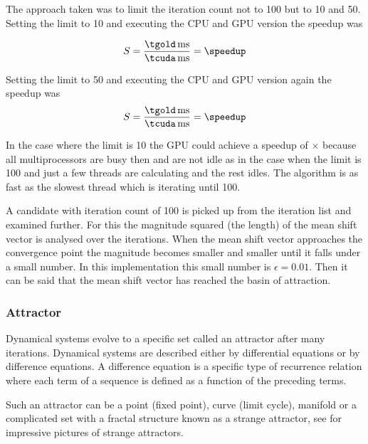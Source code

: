 The approach taken was to limit the iteration count not to 100 but to 10 and 50.
Setting the limit to 10 and executing the \gls{CPU} and \gls{GPU} version the
speedup was 
 
\fpDiv{\speedupten}{\tgold}{\tcuda}
\begin{equation*}\label{eq:speedup7}
		S = \frac{\unit[\tgold]{ms}}{\unit[\tcuda]{ms}} = \speedup
\end{equation*}

Setting the limit to 50 and executing the \gls{CPU} and \gls{GPU} version again
the speedup was
\fpDiv{\speedup}{\tgold}{\tcuda}
\begin{equation*}\label{eq:speedup8}
	S = \frac{\unit[\tgold]{ms}}{\unit[\tcuda]{ms}} = \speedup
\end{equation*}

In the case where the limit is 10 the \gls{GPU} could achieve a speedup of 
\fpDiv{\speedup}{\tgold}{\tcuda} \speedupten$\times$ because all multiprocessors
are busy then and are not idle as in the case when the limit is 100 and just a few
threads are calculating and the rest idles. The algorithm is as fast as the slowest
thread which is iterating until 100. 

A candidate with iteration count of 100 is picked up from the iteration list and
examined further. For this the magnitude squared (the length) of the mean shift
vector is analysed over the iterations. When the mean shift vector approaches
the convergence point the magnitude becomes smaller and smaller until it falls
under a small number. In this implementation this small number is
$\epsilon=0.01$. Then it can be said that the mean shift vector has reached the
basin of attraction.

\subsubsection{Attractor} %
\label{ssub:attractor}
Dynamical systems evolve to a specific set called an attractor after many
iterations. Dynamical systems are described either by differential equations or
by difference equations. A difference equation is a specific type of recurrence
relation where each term of a sequence is defined as a function of the
preceding terms.

Such an attractor can be a point (fixed point), curve (limit cycle), manifold or
a complicated set with a fractal structure known as a strange attractor, see
\citeauthor{citeulike:3745535} \citep{citeulike:3745535} for impressive pictures
of strange attractors.

